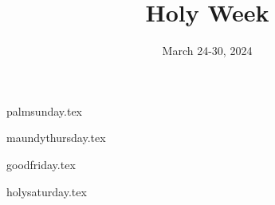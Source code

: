 \documentclass[letterpaper]{report}
\title{Holy Week}
\date{March 24-30, 2024}
\begin{document}
\maketitle

{palmsunday.tex}

{maundythursday.tex}

{goodfriday.tex}

{holysaturday.tex}

\printbibliography
\end{document}
